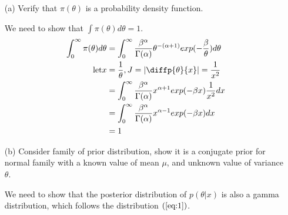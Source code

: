 \begin{itemize}
	\item [(a)] Verify that $\pi(\theta)$ is a probability density function.
	
	We need to show that $\int \pi(\theta) d\theta = 1$.
	\begin{align*}
	\int_{0}^{\infty}	\pi(\theta) d \theta &= 
		\int_{0}^{\infty}	\frac{\beta^{\alpha} }{\Gamma(\alpha)} \theta^{-(\alpha + 1)} exp(-\frac{\beta}{\theta}) d \theta \\
		\text{let} x &= \frac{1}{\theta}, J = |\diffp{\theta}{x}| = \frac{1}{x^2} \\
		&= \int_{0}^{\infty} \frac{\beta^{\alpha}}{\Gamma(\alpha)} x^{\alpha + 1} exp(-\beta x) \frac{1}{x^2} dx \\
		&= \int_{0}^{\infty} \frac{\beta^{\alpha}}{\Gamma(\alpha)} x^{\alpha -1} exp(-\beta x)  dx \\
		&= 1
	\end{align*}
	
	\item[(b)] Consider family of prior distribution, show it is a conjugate prior for normal family with a known value of mean $\mu$, and unknown value of variance $\theta$. 
	
	 We need to show that the posterior distribution of $p(\theta|x)$ is also a gamma distribution, which follows the distribution $(\ref{eq:1})$.
	 

\end{itemize}
